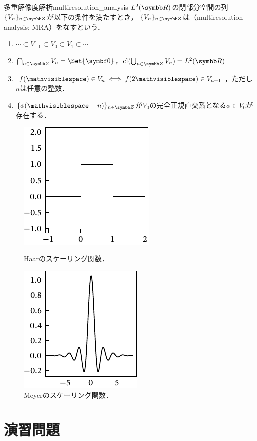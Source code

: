 \documentclass[../../main]{subfiles}
\begin{document}
\begin{definition}{多重解像度解析}{multiresolution_analysis}
  \(\Lebesgue{2}(\numset{R})\)の閉部分空間の列\(\seq{V_n}_{n\in\numset{Z}}\)が以下の条件を満たすとき，
  \(\seq{V_n}_{n\in\numset{Z}}\)は（multiresolution analysis; MRA）をなすという．
  \begin{enumerate}
    \item \(\dotsb\subset V_{-1}\subset V_0\subset V_1\subset\dotsb\)
    \item \(\bigcap_{n\in\numset{Z}}V_n=\Set{\vect{0}}\)，\(\clsr(\bigcup_{n\in\numset{Z}}V_n)=\Lebesgue{2}(\numset{R})\)
    \item \(f(\holder)\in V_n\iff f(2\holder)\in V_{n+1}\)，ただし\(n\)は任意の整数．
    \item \(\seq{\phi(\holder-n)}_{n\in\numset{Z}}\)が\(V_0\)の完全正規直交系となる\(\phi\in V_0\)が存在する．
  \end{enumerate}
\end{definition}

\begin{figure}[htbp]
  \begin{minipage}{0.5\linewidth}
    \centering
    \includegraphics{haar_scaling}
    \caption{Haarのスケーリング関数．}
  \end{minipage}%
  \begin{minipage}{0.5\linewidth}
    \centering
    \includegraphics{meyer_scaling}
    \caption{Meyerのスケーリング関数．}
  \end{minipage}
\end{figure}

\section*{演習問題}
\end{document}
